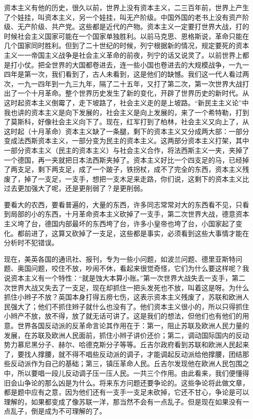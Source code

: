 资本主义有他的历史，很久以前，世界上没有资本主义，二三百年前，世界上产生了个娃挂，叫资本主义，另一个娃挂，叫无产阶级。中国外国的老书上没有资产阶级、无产阶级、共产党。这些都是近代的产物。资本主义一定要打世界大战，打的时候社会主义国家可能在一个国家单独胜利。以前马克思、恩格斯说，革命只能在几个国家同时胜利。但到了二十世纪的时候，列宁根据新的情况，规定要死的资本主义一一帝国主义战争是社会主义革命的前夜，列宁的话又说灵了。以前世界上都是打小仗。把全世界的大国都卷进去，连一些小国也卷进去的大规模战争，一九一四年是第一次，我们看到了，古人未看到，这是他们的缺憾。我们这一代人看过两次，一九一四年到一九三九年，隔了二十五年，又打了第二次，第一次世界大战打出了一个十月革命。整个世界历史发生了新的变化，开辟了世界历史的新时代。从这时起资本主义倒霉了，走下坡路了，社会主义走的是上坡路。“新民主主义论”中我也讲的资本主义是向下发展的，社会主义是向上发展的，来了一个希特勒，打到了莫斯科，好像社会主义向下了。现在，红军打到了柏林，社会主义又向上了，从这时起（十月革命）资本主义缺了一条腿，剩下的资本主义又分成两大部：一部分变成法西斯资本主义，一部分变为民主的资本主义。这两部分资本主义打架，其中一部分资本主义（民主的资本主义）与社会主义合作，将法西斯主义一夹，夹掉了一个德国，再一夹就把日本法西斯夹掉了。资本主义好比一个四支足的马，已经掉了两支足，剩下两支足，成了一个跛子，铁拐杖，成不了完全的东西，资本主义残废了，掉了一支足，一支手，想把一支木足来走路，你们说，这剩下的资本主义比过去更加强大了呢，还是更削弱了？是更削弱。

要看大的农西，要看普遍的，大量的东西，许多同志常常对大的东西看不见，只看到局部的小的东西，十月革命资本主义砍掉了一支手，第二次世界大战，德意资本主义垮了台，德国内部最坏的东西垮了台，许多小皇帝也垮了台，小国家起了变化。都前进了，这算又砍掉了一支足，这些都是事实，必须看到这些大事情才能在分析时不犯错误。

现在，美英各国的通讯社、报刊，专为一些小问题，如波兰问题、德里亚斯特问题、奥国问题，咬住不放，吵闹不休，看起来很觉奇怪，它们为什么要这样呢？我说资本主义有一个特性：“就是蚀大本算小账。”第一次世界大战失去一支手，第二次世界大战又失去了一支足，现在却抓住一把头发死也不放，叫着这是呀。为什么抓住小辫子不放？英国本身打得五痨七伤，这表示资本主义残废了，苏联和欧洲人民强大了；他们不抓住辫子就什么也没有了。他们资本主义很小的，所以只得抓住小辫产不放，放不得，放了就无话可讲了。这是我们的想法，但他们也有他们的用意。世界各国反动派的反革命言论其作用在于：第一，阻止苏联及欧洲人民力量的发展，在苏联及欧洲人民面前，抓住小辫子讲价还价；第二，调动国际国内的反动势力慕尼黑分子、赫尔、哈德克斯分子等等。丘吉尔政府看到苏联和欧洲人民起来了，要找人撑腰，就不得不唱些反动派的调子，才能调起反动派给他撑腰，团结那些反动派作为自己的基础；第三，镇压革命人民。丘吉尔发现他在欧洲人民包围之中，所以要唱一段儿反动调子压一压人民。一共三个作用。由此看来，我们便懂得旧会山争论的那么凶是为什么。将来东方问题还要争论的。这些争论将此做文章，都是题中应有之意，因为他们还有一支手一支足未砍掉，它还不甘心，争论是可以理解的，如果都变成了像苏联一洋，那当然不会有一点乱子。但是现在如果没有一点乱子，倒是成为不可理解的了。

